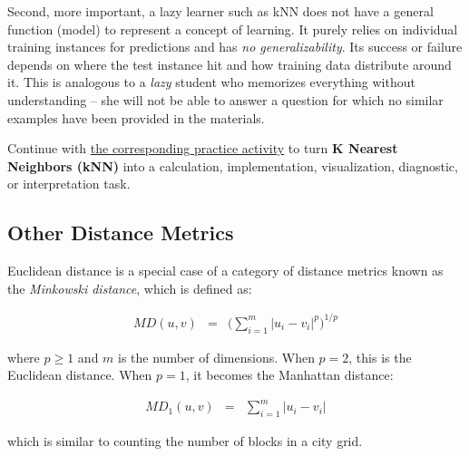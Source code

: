 \documentclass[
  letterpaper,
]{scrbook}
\begin{document}
Second, more important, a lazy learner such as kNN does not have a
general function (model) to represent a concept of learning. It purely
relies on individual training instances for predictions and has \emph{no
generalizability}. Its success or failure depends on where the test
instance hit and how training data distribute around it. This is
analogous to a \emph{lazy} student who memorizes everything without
understanding -- she will not be able to answer a question for which no
similar examples have been provided in the materials.

\begin{tcolorbox}[enhanced jigsaw, arc=.35mm, bottomrule=.15mm, bottomtitle=1mm, breakable, colback=white, colbacktitle=quarto-callout-tip-color!10!white, colframe=quarto-callout-tip-color-frame, coltitle=black, left=2mm, leftrule=.75mm, opacityback=0, opacitybacktitle=0.6, rightrule=.15mm, title=\textcolor{quarto-callout-tip-color}{\faLightbulb}\hspace{0.5em}{Put it into practice}, titlerule=0mm, toprule=.15mm, toptitle=1mm]

Continue with \hyperref[sec-pr-07-k-nearest-neighbors-knn]{the
corresponding practice activity} to turn \textbf{K Nearest Neighbors
(kNN)} into a calculation, implementation, visualization, diagnostic, or
interpretation task.

\end{tcolorbox}

\subsection{Other Distance Metrics}\label{other-distance-metrics}

Euclidean distance is a special case of a category of distance metrics
known as the \emph{Minkowski distance}, which is defined as:

\[\begin{aligned}
  MD(u, v) & = & \Big(\sum_{i=1}^{m} |u_i - v_i|^p\Big)^{1/p}
\end{aligned}\]

where \(p \ge 1\) and \(m\) is the number of dimensions. When \(p=2\),
this is the Euclidean distance. When \(p=1\), it becomes the Manhattan
distance:

\[\begin{aligned}
  MD_1(u, v) & = & \sum_{i=1}^{m} |u_i - v_i|
\end{aligned}\]

which is similar to counting the number of blocks in a city grid.
\end{document}
